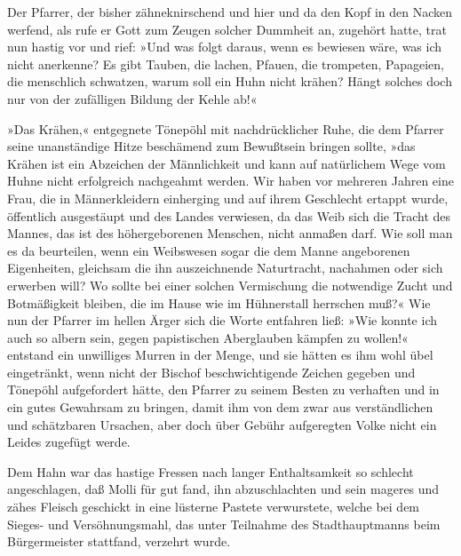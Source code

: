 Der Pfarrer, der bisher zähneknirschend und hier und da den Kopf in
den Nacken werfend, als rufe er Gott zum Zeugen solcher Dummheit
an, zugehört hatte, trat nun hastig vor und rief: »Und was folgt
daraus, wenn es bewiesen wäre, was ich nicht anerkenne? Es gibt
Tauben, die lachen, Pfauen, die trompeten, Papageien, die
menschlich schwatzen, warum soll ein Huhn nicht krähen? Hängt
solches doch nur von der zufälligen Bildung der Kehle ab!«

»Das Krähen,« entgegnete Tönepöhl mit nachdrücklicher Ruhe, die dem
Pfarrer seine unanständige Hitze beschämend zum Bewußtsein bringen
sollte, »das Krähen ist ein Abzeichen der Männlichkeit und kann auf
natürlichem Wege vom Huhne nicht erfolgreich nachgeahmt werden. Wir
haben vor mehreren Jahren eine Frau, die in Männerkleidern
einherging und auf ihrem Geschlecht ertappt wurde, öffentlich
ausgestäupt und des Landes verwiesen, da das Weib sich die Tracht
des Mannes, das ist des höhergeborenen Menschen, nicht anmaßen
darf. Wie soll man es da beurteilen, wenn ein Weibswesen sogar die
dem Manne angeborenen Eigenheiten, gleichsam die ihn auszeichnende
\pagenum{[51]} Naturtracht, nachahmen oder sich erwerben will? Wo
sollte bei einer solchen Vermischung die notwendige Zucht und
Botmäßigkeit bleiben, die im Hause wie im Hühnerstall herrschen
muß?« Wie nun der Pfarrer im hellen Ärger sich die Worte entfahren
ließ: »Wie konnte ich auch so albern sein, gegen papistischen
Aberglauben kämpfen zu wollen!« entstand ein unwilliges Murren in
der Menge, und sie hätten es ihm wohl übel eingetränkt, wenn nicht
der Bischof beschwichtigende Zeichen gegeben und Tönepöhl
aufgefordert hätte, den Pfarrer zu seinem Besten zu verhaften und
in ein gutes Gewahrsam zu bringen, damit ihm von dem zwar aus
verständlichen und schätzbaren Ursachen, aber doch über Gebühr
aufgeregten Volke nicht ein Leides zugefügt werde.

Dem Hahn war das hastige Fressen nach langer Enthaltsamkeit so
schlecht angeschlagen, daß Molli für gut fand, ihn abzuschlachten
und sein mageres und zähes Fleisch geschickt in eine lüsterne
Pastete verwurstete, welche bei dem Sieges- und Versöhnungsmahl,
das unter Teilnahme des Stadthauptmanns beim Bürgermeister
stattfand, verzehrt wurde.


